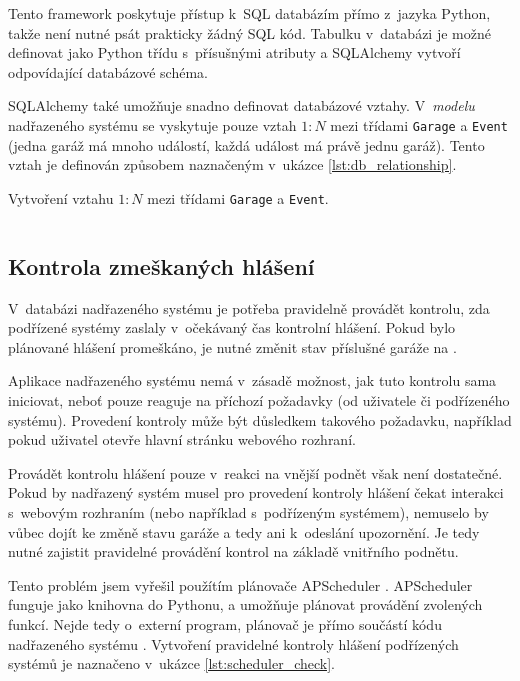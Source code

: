 Tento framework poskytuje přístup k~SQL databázím přímo z~jazyka Python, takže není nutné psát prakticky žádný SQL kód. Tabulku v~databázi je možné definovat jako Python třídu s~přísušnými atributy a SQLAlchemy vytvoří odpovídající databázové schéma. 

SQLAlchemy také umožňuje snadno definovat databázové vztahy. V~\textit{modelu} nadřazeného systému se vyskytuje pouze vztah $1:N$ mezi třídami \texttt{Garage} a \texttt{Event} (jedna garáž má mnoho událostí, každá událost má právě jednu garáž). Tento vztah je definován způsobem naznačeným v~ukázce \ref{lst:db_relationship}.

\begin{listing}[htbp]
\caption{\label{lst:db_relationship} Vytvoření vztahu $1:N$ mezi třídami \texttt{Garage} a \texttt{Event}.}
\inputminted[bgcolor=codebg]{python}{source-samples/db_relationship.py}
\end{listing}

\subsection{Kontrola zmeškaných hlášení}
\label{sec:im_scheduler}

V~databázi nadřazeného systému je potřeba pravidelně provádět kontrolu, zda podřízené systémy zaslaly v~očekávaný čas kontrolní hlášení. Pokud bylo plánované hlášení promeškáno, je nutné změnit stav příslušné garáže na .

Aplikace nadřazeného systému nemá v~zásadě možnost, jak tuto kontrolu sama iniciovat, neboť pouze reaguje na příchozí požadavky (od uživatele či podřízeného systému). Provedení kontroly může být důsledkem takového požadavku, například pokud uživatel otevře hlavní stránku webového rozhraní. 

Provádět kontrolu hlášení pouze v~reakci na vnější podnět však není dostatečné. Pokud by nadřazený systém musel pro provedení kontroly hlášení čekat interakci s~webovým rozhraním (nebo například s~podřízeným systémem), nemuselo by vůbec dojít ke změně stavu garáže a tedy ani k~odeslání upozornění. Je tedy nutné zajistit pravidelné provádění kontrol na základě vnitřního podnětu.

Tento problém jsem vyřešil použítím plánovače APScheduler \cite{apscheduler}. APScheduler funguje jako knihovna do Pythonu, a umožňuje plánovat provádění zvolených funkcí. Nejde tedy o~externí program, plánovač je přímo součástí kódu nadřazeného systému \cite{apscheduler}. Vytvoření pravidelné kontroly hlášení podřízených systémů je naznačeno v~ukázce \ref{lst:scheduler_check}.

